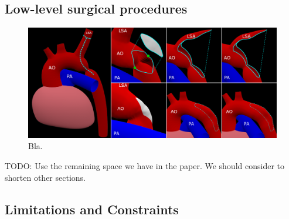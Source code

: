 \subsection{Low-level surgical procedures}

\begin{figure}[tbh]
  \centering
  \includegraphics[width=\columnwidth]{img/surgery.png}
  \caption{Bla.}
\end{figure}

TODO: Use the remaining space we have in the paper. We should consider to shorten other sections.

\subsection{Limitations and Constraints}

